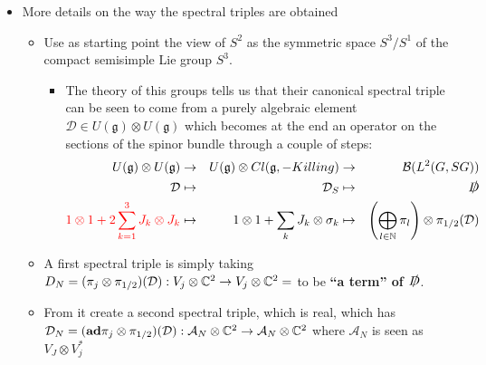 \documentclass{article}
\newcommand{\alg}[1]{\ensuremath{\mathfrak{#1}}}
\begin{document}
    \begin{itemize}

    \item More details on the way the spectral triples are obtained
        
        \begin{itemize}
        
        \item Use as starting point the view of $S^2$ as the symmetric space $S^3/S^1$ of the compact semisimple Lie group $S^3$.
    
            \begin{itemize}
                
            \item The theory of this groups tells us that their canonical spectral triple can be seen to come from a purely algebraic element $\mathcal D \in U(\alg g) \otimes U(\alg g)$ which becomes at the end an operator on the sections of the spinor bundle through a couple of steps:
            \begin{align}
                U(\alg g) \otimes U(\alg g) &\to& U(\alg g) \otimes Cl(\alg g, -Killing) &\to& \mathcal B(L^2(G, SG)) \\
                \mathcal D  &\mapsto& \mathcal D_S &\mapsto& \slashed D \\
                \rtext{1 \otimes 1 + 2 \sum_{k = 1}^3 J_k \otimes J_k} &\mapsto& 1 \otimes 1 + \sum_k J_k \otimes \sigma_k &\mapsto& \left( \bigoplus_{l\in \NN} \pi_l \right) \otimes \pi_{1/2}(\mathcal D)
            \end{align}
            
            \end{itemize}
        
        \item A first spectral triple is simply taking $D_N = (\pi_j \otimes \pi_{1/2})(\mathcal D): V_j \otimes \mathbb{C}^2 \to V_j \otimes \mathbb{C}^2 = $ to be \textbf{``a term'' of $\slashed D$}.
        
        \item From it create a second spectral triple, which is real, which has $\mathcal D_N = (\textbf{ad}\pi_j \otimes \pi_{1/2})(\mathcal D): \mathcal A_N \otimes \mathbb{C}^2 \to \mathcal A_N \otimes \mathbb{C}^2$ where $\mathcal A_N$ is seen as $V_J \otimes V_j^*$
            
        \end{itemize}
    
    \end{itemize}
\end{document}
